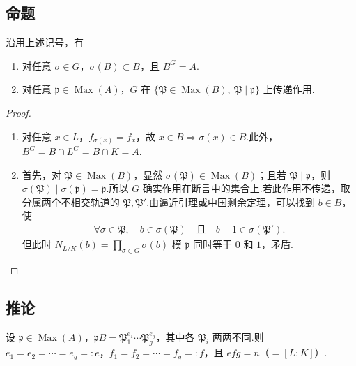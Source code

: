 \subsection{命题}\label{sec:nt-3-5-1}
\begin{proposition*}
沿用上述记号，有
\begin{enumerate}[label=\roman*)]
\item 对任意 $\sigma\in G$，$\sigma(B)\subset B$，且 $B^G=A$.
\item 对任意 $\mathfrak p\in\operatorname{Max}(A)$，$G$ 在 $\{\mathfrak P\in\operatorname{Max}(B),\ \mathfrak P\mid\mathfrak p\}$ 上传递作用.
\end{enumerate}
\end{proposition*}
\begin{proof}
\begin{enumerate}[label=\roman*)]
\item 对任意 $x\in L$，$f_{\sigma(x)}=f_x$，故 $x\in B\Rightarrow\sigma(x)\in B$.此外，$B^G=B\cap L^G=B\cap K=A$.
\item 首先，对 $\mathfrak P\in\operatorname{Max}(B)$，显然 $\sigma(\mathfrak P)\in\operatorname{Max}(B)$；且若 $\mathfrak P\mid\mathfrak p$，则 $\sigma(\mathfrak P)\mid\sigma(\mathfrak p)=\mathfrak p$.所以 $G$ 确实作用在断言中的集合上.若此作用不传递，取分属两个不相交轨道的 $\mathfrak P,\mathfrak P'$.由逼近引理或中国剩余定理，可以找到 $b\in B$，使
\begin{align*}
\forall\sigma\in\mathfrak P,\quad b\in\sigma(\mathfrak P)\quad\text{且}\quad b-1\in\sigma(\mathfrak P').
\end{align*}
但此时 $N_{L/K}(b)=\prod_{\sigma\in G}\sigma(b)$ 模 $\mathfrak p$ 同时等于 $0$ 和 $1$，矛盾.
\end{enumerate}
\end{proof}

\subsection{推论}\label{sec:nt-3-5-2}
\begin{corollary*}
设 $\mathfrak p\in\operatorname{Max}(A)$，$\mathfrak pB=\mathfrak P_1^{e_1}\cdots\mathfrak P_g^{e_g}$，其中各 $\mathfrak P_i$ 两两不同.则 $e_1=e_2=\cdots=e_g=:e$，$f_1=f_2=\cdots=f_g=:f$，且 $efg=n$（$=[L:K]$）.
\end{corollary*}

